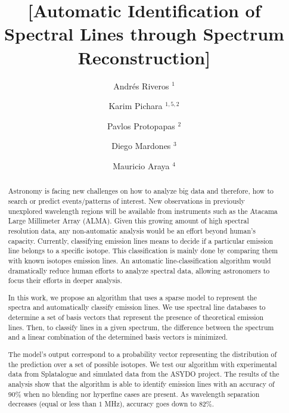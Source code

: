 \documentclass[iop,apj]{emulateapj}
\begin{document}
\title{[Automatic Identification of Spectral Lines through Spectrum Reconstruction]}
\author{Andr\'es Riveros	$^1$}
\author{Karim Pichara		$^{1,5, 2}$}
\author{Pavlos Protopapas	$^2$}
\author{Diego Mardones		$^3$}
\author{Mauricio Araya		$^4$}

\begin{abstract}

\begin{comment}
    - Massive Amount of Data
    - Astronomers overloaded
    - What is spectroscopy
    - Need to automatize process
    - Step by step task of astronomer
    - Focus of this work
    - Automatic Proposed Algorithm
    - Detailing Algorithm Operation
    - Reached Results
    - Strengths and limitations
    - Conclusions
\end{comment}


Astronomy is facing new challenges on how to analyze big data and therefore, how to search or predict events/patterns of interest.
New observations in previously unexplored wavelength regions will be available from instruments such as  the Atacama Large Millimeter Array (ALMA).
Given this growing amount of high spectral resolution data, any non-automatic analysis would be an effort beyond human's capacity.
Currently, classifying emission lines means to decide if a particular emission line belongs to a specific isotope. 
This classification is mainly done by comparing them with known isotopes emission lines.
An automatic line-classification algorithm would dramatically reduce human efforts to analyze spectral data, allowing astronomers to focus their efforts in deeper analysis.

In this work, we propose an algorithm that uses a sparse model to represent the spectra and automatically classify emission lines.
We use spectral line databases to determine a set of basis vectors that represent the presence of theoretical emission lines.
Then, to classify lines in a given spectrum, the difference between the spectrum and a linear combination of the determined basis vectors is minimized.

The model's output correspond to a probability vector representing the distribution of the prediction over a set of possible isotopes. 
We test our algorithm with experimental data from Splatalogue and simulated data from the ASYDO project.
The results of the analysis show that the algorithm is able to identify emission lines with an accuracy of 90\% when no blending nor hyperfine cases are present.
As wavelength separation decreases (equal or less than $1$ MHz), accuracy goes down to 82\%.


\end{abstract}
\end{document}
